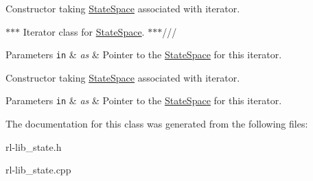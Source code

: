 Constructor taking \hyperlink{classStateSpace}{State\-Space} associated with iterator. 

$\ast$$\ast$$\ast$ Iterator class for \hyperlink{classStateSpace}{State\-Space}. $\ast$$\ast$$\ast$///


\begin{DoxyParams}[1]{Parameters}
\mbox{\tt in}  & {\em as} & Pointer to the \hyperlink{classStateSpace}{State\-Space} for this iterator.\\
\hline
\end{DoxyParams}
Constructor taking \hyperlink{classStateSpace}{State\-Space} associated with iterator. 
\begin{DoxyParams}[1]{Parameters}
\mbox{\tt in}  & {\em as} & Pointer to the \hyperlink{classStateSpace}{State\-Space} for this iterator. \\
\hline
\end{DoxyParams}


The documentation for this class was generated from the following files\-:\begin{DoxyCompactItemize}
\item 
rl-\/lib\-\_\-state.\-h\item 
rl-\/lib\-\_\-state.\-cpp\end{DoxyCompactItemize}
